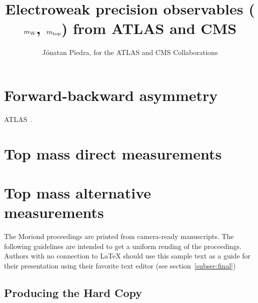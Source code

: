 \documentclass{blois}
\begin{document}
\vspace*{4cm}
\title{Electroweak precision observables ($m_{\rm W}$, $m_{\rm top}$) from ATLAS and CMS}


\author{J\'onatan Piedra, for the ATLAS and CMS Collaborations}

\address{Instituto de F\'isica de Cantabria (CSIC - University of Cantabria), Spain}

\maketitle{}


\section{Forward-backward asymmetry}

ATLAS~\cite{ATLAS-fb-asymmetry}.























\section{Top mass direct measurements}
\section{Top mass alternative measurements}

The Moriond proceedings are printed from camera-ready manuscripts.
The following guidelines are intended to get a uniform rending of the 
proceedings. Authors with no connection to \LaTeX{} should use this
sample text as a guide for their presentation using their favorite
text editor (see section~\ref{subsec:final})

\subsection{Producing the Hard Copy}\label{subsec:prod}
\end{document}
